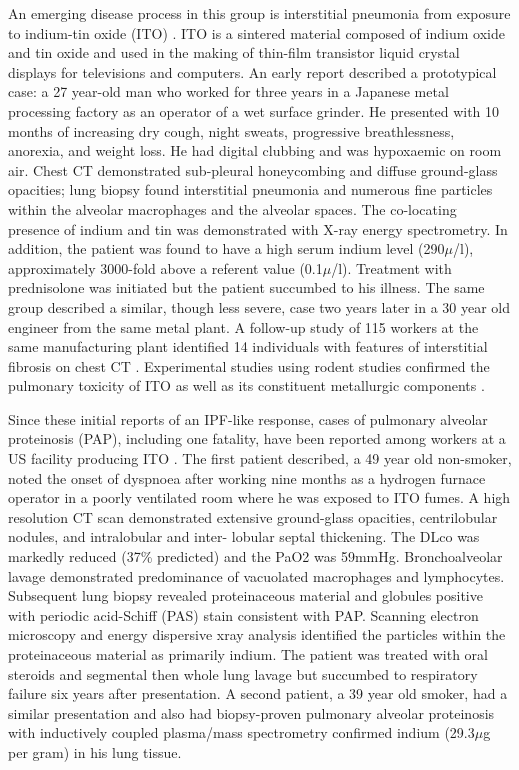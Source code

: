 \documentclass[a4paper,12pt]{article}
\begin{document}
An emerging disease process in this group is interstitial pneumonia from exposure to indium-tin oxide (ITO) \cite{Cummings2010,Cummings2012,Cummings2013,Homma2003,Homma2005, Lison2010,Lison2009,Omae2011,Tanaka2010,Xiao2010}. ITO is a sintered material composed of indium oxide and tin oxide and used in the making of thin-film transistor liquid crystal displays for televisions and computers. An early report \cite{Homma2003} described a prototypical case: a 27 year-old man who worked for three years in a Japanese metal processing factory as an operator of a wet surface grinder. He presented with 10 months of increasing dry cough, night sweats, progressive breathlessness, anorexia, and weight loss. He had digital clubbing and was hypoxaemic on room air. Chest CT demonstrated sub-pleural honeycombing and diffuse ground-glass opacities; lung biopsy found interstitial pneumonia and numerous fine particles within the alveolar macrophages and the alveolar spaces. The co-locating presence of indium and tin was demonstrated with X-ray energy spectrometry. In addition, the patient was found to have a high serum indium level (290\ensuremath{\mu}/l), approximately 3000-fold above a referent value (0.1\ensuremath{\mu}/l). Treatment with prednisolone was initiated but the patient succumbed to his illness. The same group described a similar, though less severe, case two years later \cite{Homma2005} in a 30 year old engineer from the same metal plant. A follow-up study of 115 workers at the same manufacturing plant identified 14 individuals with features of interstitial fibrosis on chest CT \cite{Chonan2004}. Experimental studies using rodent studies confirmed the pulmonary toxicity of ITO as well as its constituent metallurgic components \cite{Tanaka2010,Lison2010}.

Since these initial reports of an IPF-like response, cases of pulmonary alveolar proteinosis (PAP), including one fatality, have been reported among workers at a US facility producing ITO \cite{Cummings2010}. The first patient described, a 49 year old non-smoker, noted the onset of dyspnoea after working nine months as a hydrogen furnace operator in a poorly ventilated room where he was exposed to ITO fumes. A high resolution CT scan demonstrated extensive ground-glass opacities, centrilobular nodules, and intralobular and inter- lobular septal thickening. The DLco was markedly reduced (37\% predicted) and the PaO2 was 59mmHg. Bronchoalveolar lavage demonstrated predominance of vacuolated macrophages and lymphocytes. Subsequent lung biopsy revealed proteinaceous material and globules positive with periodic acid-Schiff (PAS) stain consistent with PAP. Scanning electron microscopy and energy dispersive xray analysis identified the particles within the proteinaceous material as primarily indium. The patient was treated with oral steroids and segmental then whole lung lavage but succumbed to respiratory failure six years after presentation. A second patient, a 39 year old smoker, had a similar presentation and also had biopsy-proven pulmonary alveolar proteinosis with inductively coupled plasma/mass spectrometry confirmed indium (29.3\ensuremath{\mu}g per gram) in his lung tissue.
\end{document}
